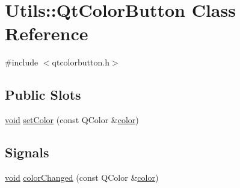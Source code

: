 \hypertarget{class_utils_1_1_qt_color_button}{\section{\-Utils\-:\-:\-Qt\-Color\-Button \-Class \-Reference}
\label{class_utils_1_1_qt_color_button}
}


{\ttfamily \#include $<$qtcolorbutton.\-h$>$}

\subsection*{\-Public \-Slots}
\begin{DoxyCompactItemize}
\item 
\hyperlink{group___u_a_v_objects_plugin_ga444cf2ff3f0ecbe028adce838d373f5c}{void} \hyperlink{class_utils_1_1_qt_color_button_a6d9dde2142473a73dc67b736feea3496}{set\-Color} (const \-Q\-Color \&\hyperlink{class_utils_1_1_qt_color_button_a92e2a2c0c46041074dddcbdc67ae682a}{color})
\end{DoxyCompactItemize}
\subsection*{\-Signals}
\begin{DoxyCompactItemize}
\item 
\hyperlink{group___u_a_v_objects_plugin_ga444cf2ff3f0ecbe028adce838d373f5c}{void} \hyperlink{class_utils_1_1_qt_color_button_a795089187f11a4615620dafa852246c9}{color\-Changed} (const \-Q\-Color \&\hyperlink{class_utils_1_1_qt_color_button_a92e2a2c0c46041074dddcbdc67ae682a}{color})
\end{DoxyCompactItemize}
